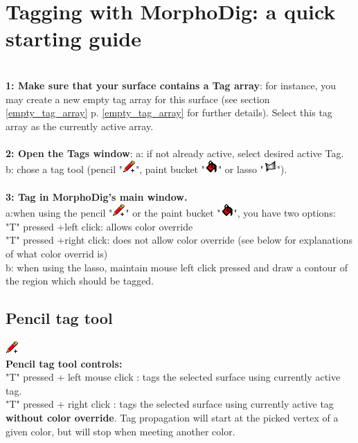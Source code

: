 \section{Tagging with MorphoDig: a quick starting guide}\label{tag_starting_guide}
\textbf{\underline{}}\\
\textbf{1: Make sure that your surface contains a Tag array}: for instance, you may create a new empty tag array for this surface (see section \ref{empty_tag_array} p. \ref{empty_tag_array} for further details). Select this tag array as the currently active array.\\\\
\noindent
\textbf{2: Open the Tags window}: a: if not already active, select desired active Tag. b: chose a tag tool (pencil "\includegraphics[scale=0.7]{images/12/pencil.png}", paint bucket "\includegraphics[scale=0.7]{images/12/paint_bucket.png}" or lasso "\includegraphics[scale=0.7]{images/12/lasso.png}").  \\\\
\noindent
\textbf{3: Tag in MorphoDig's main window.} \\ a:when using the pencil "\includegraphics[scale=0.7]{images/12/pencil.png}" or the paint bucket "\includegraphics[scale=0.7]{images/12/paint_bucket.png}", you have two options:\\
 "T" pressed +left click: allows color override\\
 "T" pressed +right click: does not allow color override (see below for explanations of what color overrid is)\\
b: when using the lasso, maintain mouse left click pressed and draw a contour of the region which should be tagged.



\subsection{Pencil tag tool}
\includegraphics[scale=0.7]{images/12/pencil.png}\\
\textbf{Pencil tag tool controls:}\\
"T" pressed + left mouse click : tags the selected surface using currently active tag.\\
"T" pressed + right click : tags the selected surface using currently active tag \textbf{without color override}. Tag propagation will start at the picked vertex of a given color, but will stop when meeting another color.\\

